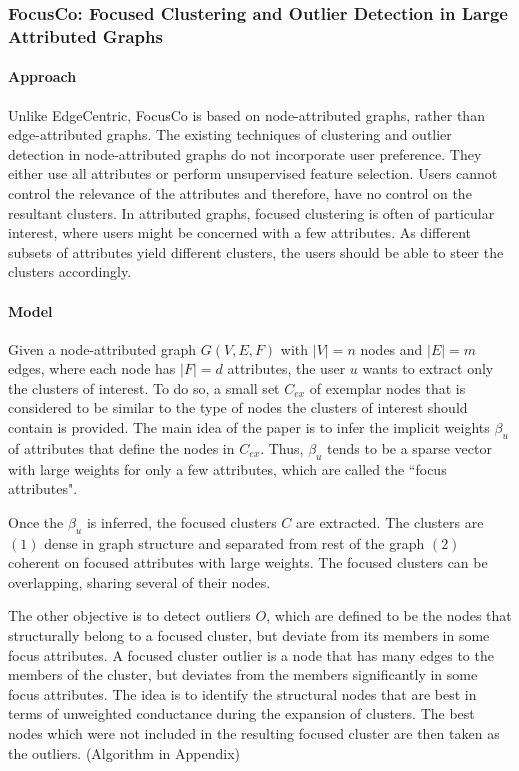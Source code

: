 \documentclass[11pt, oneside]{article}   	%
\begin{document}
\subsubsection{FocusCo: Focused Clustering and Outlier Detection in Large Attributed Graphs }

\paragraph{Approach}
\quad

\quad Unlike EdgeCentric, FocusCo \cite{focusco} is based on node-attributed graphs, rather than edge-attributed graphs.
The existing techniques of clustering and outlier detection in node-attributed graphs do not incorporate user preference.
They either use all attributes or perform unsupervised feature selection.
Users cannot control the relevance of the attributes and therefore, have no control on the resultant clusters.
In attributed graphs, focused clustering is often of particular interest, where users might be concerned with a few attributes. 
As different subsets of attributes yield different clusters, the users should be able to steer the clusters accordingly.

\paragraph{Model}
\quad

\quad Given a node-attributed graph $G(V,E,F)$ with $|V|=n$ nodes and $|E|=m$ edges, where each node has $|F| = d$ attributes, the user $u$ wants to extract only the clusters of interest.
To do so, a small set $C_{ex}$ of exemplar nodes that is considered to be similar to the type of nodes the clusters of interest should contain is provided.
The main idea of the paper is to infer the implicit weights $\beta_{u}$ of attributes that define the nodes in $C_{ex}$.
Thus, $\beta_u$ tends to be a sparse vector with large weights for only a few attributes, which are called the ``focus attributes".

\quad Once the $\beta_u$ is inferred, the focused clusters $C$ are extracted. 
The clusters are $(1)$ dense in graph structure and separated from rest of the graph $(2)$ coherent on focused attributes with large weights.
The focused clusters can be overlapping, sharing several of their nodes.

\quad The other objective is to detect outliers $O$, which are defined to be the nodes that structurally belong to a focused cluster, but deviate from its members in some focus attributes. A focused cluster outlier is a node that has many edges to the members of the cluster, but deviates from the members significantly in some focus attributes.
The idea is to identify the structural nodes that are best in terms of unweighted conductance during the expansion of clusters.
The best nodes which were not included in the resulting focused cluster are then taken as the outliers. (Algorithm in Appendix)
\end{document}
